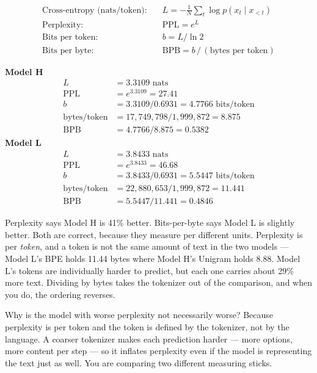 \documentclass[11pt]{report}
\begin{document}
\begin{align*}
\text{Cross-entropy (nats/token):} \quad & L = -\frac{1}{N}\sum_t \log p(x_t \mid x_{<t}) \\
\text{Perplexity:} \quad & \mathrm{PPL} = e^{L} \\
\text{Bits per token:} \quad & b = L / \ln 2 \\
\text{Bits per byte:} \quad & \mathrm{BPB} = b \,/\, (\text{bytes per token})
\end{align*}

\begin{vexample}
\textbf{Model H}
\begin{align*}
L &= 3.3109 \text{ nats} \\
\mathrm{PPL} &= e^{3.3109} = 27.41 \\
b &= 3.3109 / 0.6931 = 4.7766 \text{ bits/token} \\
\text{bytes/token} &= 17{,}749{,}798 / 1{,}999{,}872 = 8.875 \\
\mathrm{BPB} &= 4.7766 / 8.875 = 0.5382
\end{align*}
\textbf{Model L}
\begin{align*}
L &= 3.8433 \text{ nats} \\
\mathrm{PPL} &= e^{3.8433} = 46.68 \\
b &= 3.8433 / 0.6931 = 5.5447 \text{ bits/token} \\
\text{bytes/token} &= 22{,}880{,}653 / 1{,}999{,}872 = 11.441 \\
\mathrm{BPB} &= 5.5447 / 11.441 = 0.4846
\end{align*}
\end{vexample}

\begin{sayit}
Perplexity says Model H is 41\% better. Bits-per-byte says Model L is slightly
better. Both are correct, because they measure per different units. Perplexity
is per \emph{token}, and a token is not the same amount of text in the two
models --- Model L's BPE holds 11.44 bytes where Model H's Unigram holds 8.88.
Model L's tokens are individually harder to predict, but each one carries about
29\% more text. Dividing by bytes takes the tokenizer out of the comparison,
and when you do, the ordering reverses.
\end{sayit}

\begin{qabox}{Why is the model with worse perplexity not necessarily worse?}
Because perplexity is per token and the token is defined by the tokenizer, not
by the language. A coarser tokenizer makes each prediction harder --- more
options, more content per step --- so it inflates perplexity even if the model
is representing the text just as well. You are comparing two different
measuring sticks.
\end{qabox}
\end{document}
